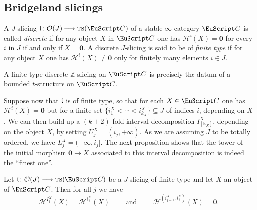 \subsection{Bridgeland slicings} \label{confronto}
\begin{definition}
A $J$-slicing $\tee\colon \O(J)\to  \ts(\C)$ of a stable $\infty$-category $\C$ is called \emph{discrete} if for any object $X$ in $\C$ one has $\mathcal{H}^i(X)=\mathbf{0}$ for every $i$ in $J$ if and only if $X=\mathbf{0}$. A discrete $J$-slicing is said to be of \emph{finite type} if for any object $X$ one has $\mathcal{H}^i(X)\neq\mathbf{0}$ only for finitely many elements $i\in J$.
\end{definition}
\begin{example}\label{example.bounded-t-structure}
A finite type discrete $\mathbb{Z}$-slicing on $\C$ is precisely the datum of a bounded $t$-structure on $\C$.
\end{example}
Suppose now that $\mathfrak{t}$ is of finite type, so that for each $X \in \C$ one has $\mathcal{H}^i(X)=\mathbf{0}$ but for a finite set $\{ i_1^X < \cdots < i_{k_X}^X \} \subseteq J$ of indices $i$, depending on $X$. We can then build up a $(k+2)$-fold interval decomposition $I_{[ \mathbf{k}_X ]}^X$, depending on the object $X$, by setting  $U_j^X=(i_j, +\infty)$. As we are assuming $J$ to be totally ordered, we have $L_j^X=(-\infty, i_j]$. The next proposition shows that the tower of the initial morphism $\mathbf{0} \to X$ associated to this interval decomposition is indeed the ``finest one''. 
\begin{proposition}
Let $\tee\colon \mathcal{O}(J)\to \ts(\C)$ be a $J$-slicing of finite type and let $X$ an object of $\C$. Then for all $j$ we have
\[
\mathcal{H}^{I_j^X}(X)=\mathcal{H}^{i_j^X}(X)
\qquad\text{ and }\qquad  \mathcal{H}^{(i_{j-1}^X,i_{j}^X)}(X)=\mathbf{0}.
\]
\end{proposition}
